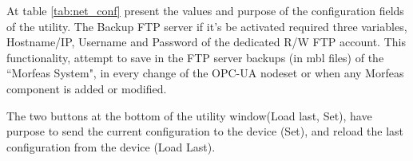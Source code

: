 At table \ref{tab:net_conf} present the values and purpose of the configuration fields of the utility.
The Backup FTP server if it's be activated required three variables, Hostname/IP,
Username and Password of the dedicated R/W FTP account.
This functionality, attempt to save in the FTP server backups (in mbl files) of the ``Morfeas System",
in every change of the OPC-UA nodeset or when any Morfeas component is added or modified.

\par
The two buttons at the bottom of the utility window(Load last, Set),
have purpose to send the current configuration to the device (Set),
and reload the last configuration from the device (Load Last).